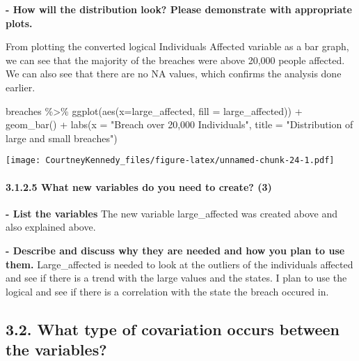 \documentclass[
]{article}
\newenvironment{Shaded}{\begin{snugshade}}{\end{snugshade}}
\newcommand{\AttributeTok}[1]{\textcolor[rgb]{0.77,0.63,0.00}{#1}}
\newcommand{\FunctionTok}[1]{\textcolor[rgb]{0.00,0.00,0.00}{#1}}
\newcommand{\NormalTok}[1]{#1}
\newcommand{\SpecialCharTok}[1]{\textcolor[rgb]{0.00,0.00,0.00}{#1}}
\newcommand{\StringTok}[1]{\textcolor[rgb]{0.31,0.60,0.02}{#1}}
\begin{document}
\textbf{- How will the distribution look? Please demonstrate with
appropriate plots.}

From plotting the converted logical Individuals Affected variable as a
bar graph, we can see that the majority of the breaches were above
20,000 people affected. We can also see that there are no NA values,
which confirms the analysis done earlier.

\begin{Shaded}
\begin{Highlighting}[]
\NormalTok{breaches }\SpecialCharTok{\%\textgreater{}\%}
  \FunctionTok{ggplot}\NormalTok{(}\FunctionTok{aes}\NormalTok{(}\AttributeTok{x=}\NormalTok{large\_affected, }\AttributeTok{fill =}\NormalTok{ large\_affected)) }\SpecialCharTok{+}
  \FunctionTok{geom\_bar}\NormalTok{() }\SpecialCharTok{+}
  \FunctionTok{labs}\NormalTok{(}\AttributeTok{x =} \StringTok{"Breach over 20,000 Individuals"}\NormalTok{, }\AttributeTok{title =} \StringTok{"Distribution of large and small breaches"}\NormalTok{)}
\end{Highlighting}
\end{Shaded}

\texttt{[image: CourtneyKennedy\_files/figure-latex/unnamed-chunk-24-1.pdf]}

\hypertarget{what-new-variables-do-you-need-to-create-3-1}{%
\paragraph{3.1.2.5 What new variables do you need to create?
(3)}\label{what-new-variables-do-you-need-to-create-3-1}}

\textbf{- List the variables} The new variable large\_affected was
created above and also explained above.

\textbf{- Describe and discuss why they are needed and how you plan to
use them.} Large\_affected is needed to look at the outliers of the
individuals affected and see if there is a trend with the large values
and the states. I plan to use the logical and see if there is a
correlation with the state the breach occured in.

\hypertarget{what-type-of-covariation-occurs-between-the-variables}{%
\subsection{3.2. What type of covariation occurs between the
variables?}\label{what-type-of-covariation-occurs-between-the-variables}}
\end{document}
